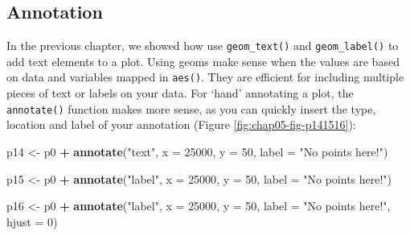 \documentclass[
  12pt,
  krantz2]{krantz}
\makeatletter
\newenvironment{Shaded}{\begin{snugshade}}{\end{snugshade}}
\newcommand{\DataTypeTok}[1]{\textcolor[rgb]{0.13,0.29,0.53}{#1}}
\newcommand{\DecValTok}[1]{\textcolor[rgb]{0.00,0.00,0.81}{#1}}
\newcommand{\KeywordTok}[1]{\textcolor[rgb]{0.13,0.29,0.53}{\textbf{#1}}}
\newcommand{\NormalTok}[1]{#1}
\newcommand{\OperatorTok}[1]{\textcolor[rgb]{0.81,0.36,0.00}{\textbf{#1}}}
\newcommand{\StringTok}[1]{\textcolor[rgb]{0.31,0.60,0.02}{#1}}
\newenvironment{kframe}{%
\medskip{}
\setlength{\fboxsep}{.8em}
 \def\at@end@of@kframe{}%
 \ifinner\ifhmode%
  \def\at@end@of@kframe{\end{minipage}}%
  \begin{minipage}{\columnwidth}%
 \fi\fi%
 \def\FrameCommand##1{\hskip\@totalleftmargin \hskip-\fboxsep
 \colorbox{shadecolor}{##1}\hskip-\fboxsep
     \hskip-\linewidth \hskip-\@totalleftmargin \hskip\columnwidth}%
 \MakeFramed {\advance\hsize-\width
   \@totalleftmargin\z@ \linewidth\hsize
   \@setminipage}}%
 {\par\unskip\endMakeFramed%
 \at@end@of@kframe}
\renewenvironment{Shaded}{\begin{kframe}}{\end{kframe}}
\makeatother
\begin{document}
\hypertarget{annotation}{%
\subsection{Annotation}\label{annotation}}


In the previous chapter, we showed how use \texttt{geom\_text()} and \texttt{geom\_label()} to add text elements to a plot.
Using geoms make sense when the values are based on data and variables mapped in \texttt{aes()}.
They are efficient for including multiple pieces of text or labels on your data.
For `hand' annotating a plot, the \texttt{annotate()} function makes more sense, as you can quickly insert the type, location and label of your annotation (Figure \ref{fig:chap05-fig-p141516}):

\begin{Shaded}
\begin{Highlighting}[]
\NormalTok{p14 <-}\StringTok{ }\NormalTok{p0 }\OperatorTok{+}
\StringTok{  }\KeywordTok{annotate}\NormalTok{(}\StringTok{"text"}\NormalTok{,}
           \DataTypeTok{x =} \DecValTok{25000}\NormalTok{,}
           \DataTypeTok{y =} \DecValTok{50}\NormalTok{,}
           \DataTypeTok{label =} \StringTok{"No points here!"}\NormalTok{)}
\end{Highlighting}
\end{Shaded}

\begin{Shaded}
\begin{Highlighting}[]
\NormalTok{p15 <-}\StringTok{ }\NormalTok{p0 }\OperatorTok{+}
\StringTok{  }\KeywordTok{annotate}\NormalTok{(}\StringTok{"label"}\NormalTok{,}
           \DataTypeTok{x =} \DecValTok{25000}\NormalTok{,}
           \DataTypeTok{y =} \DecValTok{50}\NormalTok{,}
           \DataTypeTok{label =} \StringTok{"No points here!"}\NormalTok{)}
\end{Highlighting}
\end{Shaded}

\begin{Shaded}
\begin{Highlighting}[]
\NormalTok{p16 <-}\StringTok{ }\NormalTok{p0 }\OperatorTok{+}
\StringTok{  }\KeywordTok{annotate}\NormalTok{(}\StringTok{"label"}\NormalTok{,}
           \DataTypeTok{x =} \DecValTok{25000}\NormalTok{, }
           \DataTypeTok{y =} \DecValTok{50}\NormalTok{,}
           \DataTypeTok{label =} \StringTok{"No points here!"}\NormalTok{, }
           \DataTypeTok{hjust =} \DecValTok{0}\NormalTok{)}
\end{Highlighting}
\end{Shaded}
\end{document}
